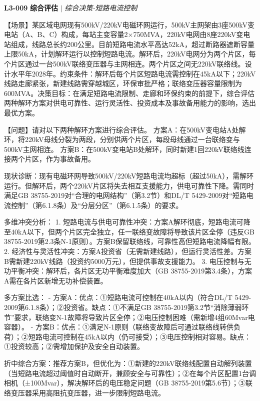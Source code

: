 \documentclass[11pt,a4paper]{ctexart}
\begin{document}
\noindent\textbf{L3-009} \hfill \textbf{综合评估} $|$ \textit{综合决策-短路电流控制}
\begin{description}[leftmargin=1.5em,style=nextline,font=\normalfont]
  \item[Q:] 【场景】某区域电网现有500kV/220kV电磁环网运行，500kV主网架由3座500kV变电站（A、B、C）构成，每站主变容量2×750MVA，220kV电网由8座220kV变电站组成，线路总长约200公里。目前短路电流水平高达52kA，超过断路器遮断容量上限50kA，计划解环运行以控制短路电流。解环后，220kV电网分为两个片区，每个片区通过一台500kV联络变压器与主网相连。两个片区之间无220kV联络线。设计水平年2028年。约束条件：解环后每个片区短路电流需控制在45kA以下；220kV线路走廊紧张，新建线路需穿越城区，环保审批严格；联络变压器容量限制为600MVA。决策目标：在满足短路电流限制、走廊和环保约束的前提下，综合评估两种解环方案对供电可靠性、运行灵活性、投资成本及事故备用能力的影响，选出最优方案。

【问题】请对以下两种解环方案进行综合评估。
方案A：在500kV变电站A处解环，将220kV母线分裂为两段，分别供两个片区，每段母线通过一台联络变与500kV主网相连。
方案B：在500kV变电站B处解环，同时新建1回220kV联络线连接两个片区，作为事故备用。
  \item[A:] 现状诊断：现有电磁环网导致500kV/220kV短路电流均超标（超过50kA），需解环运行。但解环后，两个220kV片区将失去相互支援能力，供电可靠性下降。需同时满足GB 38755-2019对“合理的电网结构”（第3.2节）和DL/T 5429-2009对“短路电流控制”（第6.1.8条）及“分层分区”（第6.1.5条）的要求。

多维冲突分析：
1. 短路电流与供电可靠性冲突：方案A解环彻底，短路电流可降至40kA以下，但两个片区完全独立，任一联络变故障将导致该片区全停（违反GB 38755-2019第2.3条N-1原则）。方案B保留联络线，可靠性高但短路电流降幅有限。
2. 经济性与灵活性冲突：方案A投资省（无需新建线路），但运行灵活性差。方案B需新建220kV线路（投资约5000万元），但提供事故支援能力。
3. 电压控制与无功平衡冲突：解环后，各片区无功平衡难度加大（GB 38755-2019第3.4条），方案A需在各片区新增无功补偿装置。

多方案比选：
- 方案A：优点：①短路电流可控制在40kA以内（符合DL/T 5429-2009第6.1.8条）；②投资省。缺点：①不满足GB 38755-2019第3.2节“消除薄弱环节”要求，联络变N-1故障将导致片区全停；②电压控制困难（需新增4组60Mvar电容器）。
- 方案B：优点：①满足N-1原则（联络变故障后可通过联络线转供负荷）；②短路电流可控制在45kA以内（仍可接受）；③电压控制相对容易。缺点：①投资较高；②需增加保护及安全自动装置。

折中综合方案：推荐方案B，但优化为：①新建的220kV联络线配置自动解列装置（当短路电流超过阈值时自动断开，兼顾安全与可靠性）；②在每个片区配置1台调相机（±100Mvar），解决解环后的电压稳定问题（GB 38755-2019第5.6节）；③联络变压器采用高阻抗变压器，进一步限制短路电流。


\end{description}
\end{document}
